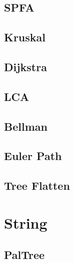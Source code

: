 \documentclass[a4paper,10pt,twocolumn,oneside]{article}
\begin{document}
\subsection{SPFA}


\subsection{Kruskal}


\subsection{Dijkstra}


\subsection{LCA}


\subsection{Bellman}


%
%

\subsection{Euler Path}


\subsection{Tree Flatten}


\section{String}
\subsection{PalTree}

\end{document}
